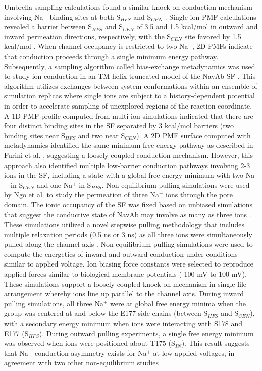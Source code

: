 \begin{refsection}
Umbrella sampling calculations found a similar knock-on conduction mechanism involving Na$^{+}$ binding sites at both S$_{HFS}$ and S$_{CEN}$ \cite{Furini:2012jl,Furini:2014gv}.  Single-ion PMF calculations revealed a barrier between S$_{HFS}$ and S$_{CEN}$ of 3.5 and 1.5 kcal/mol in outward and inward permeation directions, respectively, with the S$_{CEN}$ site favored by 1.5 kcal/mol \cite{Furini:2014gv}.  When channel occupancy is restricted to two Na$^{+}$, 2D-PMFs indicate that conduction proceeds through a single minimum energy pathway. Subsequently, a sampling algorithm called bias-exchange metadynamics was used to study ion conduction in an TM-helix truncated model of the NavAb SF \cite{Domene:2015kj}.  This algorithm utilizes exchanges between system conformations within an ensemble of simulation replicas where single ions are subject to a history-dependent potential in order to accelerate sampling of unexplored regions of the reaction coordinate.  A 1D PMF profile computed from multi-ion simulations indicated that there are four distinct binding sites in the SF separated by 3 kcal/mol barriers (two binding sites near S$_{HFS}$ and two near S$_{CEN}$).  A 2D PMF surface computed with metadynamics identified the same minimum free energy pathway as described in Furini et al. \cite{Furini:2012jl}, suggesting a loosely-coupled conduction mechanism.  However, this approach also identified multiple low-barrier conduction pathways involving 2-3 ions in the SF, including a state with a global free energy minimum with two Na$^{+}$ in S$_{CEN}$ and one Na$^{+}$ in S$_{HFS}$.
Non-equilibrium pulling simulations were used by Ngo et al. \cite{Ngo:2016es} to study the permeation of three Na$^{+}$ ions through the pore domain.  The ionic occupancy of the SF was fixed based on unbiased simulations that suggest the conductive state of NavAb may involve as many as three ions \cite{Chakrabarti:2013kd,Boiteux:2014ut}.  These simulations utilized a novel stepwise pulling methodology that includes multiple relaxation periods (0.5 ns or 3 ns) as all three ions were simultaneously pulled along the channel axis \cite{Ngo:2012kl}.  Non-equilibrium pulling simulations were used to compute the energetics of inward and outward conduction under conditions similar to applied voltage.  Ion biasing force constants were selected to reproduce applied forces similar to biological membrane potentials (-100 mV to 100 mV).  These simulations support a loosely-coupled knock-on mechanism in single-file arrangement whereby ions line up parallel to the channel axis.  During inward pulling simulations, all three Na$^{+}$ were at global free energy minima when the group was centered at and below the E177 side chains (between S$_{HFS}$ and S$_{CEN}$), with a secondary energy minimum when ions were interacting with S178 and E177 (S$_{HFS}$).  During outward pulling experiments, a single free energy minimum was observed when ions were positioned about T175 (S$_{IN}$).  This result suggests that Na$^{+}$ conduction asymmetry exists for Na$^{+}$ at low applied voltages, in agreement with two other non-equilibrium studies \cite{Stock:2013cg,Ke:2014fy}.

\end{refsection}
